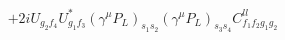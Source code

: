 %
\begin{dmath*}
%
  +  2 iU_{g_2 f_4} U_{g_1 f_3}^* (\gamma^{\mu} P_L)_{s_1 s_2} (\gamma^{\mu} P_L)_{s_3 s_4} C^{ll}_{f_1 f_2 g_1 g_2}
%
\end{dmath*}
%
